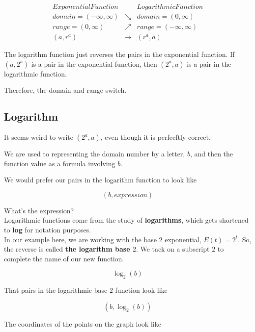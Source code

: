 \documentclass{ximera}
\begin{document}
\[
\begin{array}{lcl}
Exponential Function  &     &  Logarithmic Function  \\
domain = (-\infty, \infty)  &  \searrow  &  domain = (0, \infty)  \\
range = (0, \infty)  &  \nearrow  &  range = (-\infty, \infty)  \\
(a, r^a)    &  \longrightarrow  &   (r^a, a)
\end{array}
\]


The logarithm function just reverses the pairs in the exponential function.  If $(a, 2^a)$ is a pair in the exponential function, then $(2^a, a)$ is a pair in the logarithmic function.


Therefore, the domain and range switch. \\






\subsection{Logarithm}

It seems weird to write $(2^a, a)$, even though it is perfecftly correct.  

We are used to representing the domain number by a letter, $b$, and then the function value as a formula involving $b$.

We would prefer our pairs in the logarithm function to look like 

\[ (b, expression)  \]


What's the expression? \\





Logarithmic functions come from the study of \textbf{logarithms}, which gets shortened to \textbf{log} for notation purposes.  \\



In our example here, we are working with the base $2$ exponential, $E(t) = 2^t$. So, the reverse is called \textbf{the logarithm base $2$}.  We tack on a subscript $2$ to complete the name of our new function.



\[   \log_2(b)     \]


That pairs in the logarithmic base $2$ function look like 


\[
(b, \log_2(b))
\]


The coordinates of the points on the graph look like
\end{document}
